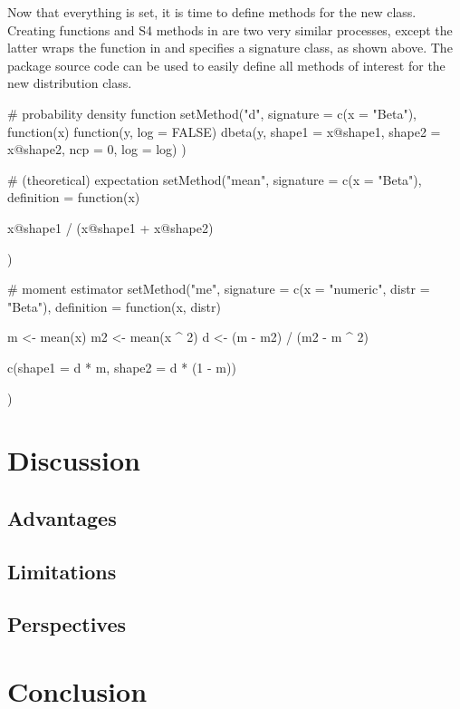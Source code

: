 \documentclass[nojss]{jss}
\newcommand{\fct}[1]{\code{#1()}}
\begin{document}
Now that everything is set, it is time to define methods for the new class. Creating functions and S4 methods in  are two very similar processes, except the latter wraps the function in \fct{setMethod} and specifies a signature class, as shown above. The package source code can be used to easily define all methods of interest for the new distribution class.

\begin{CodeChunk}
\begin{CodeInput}
# probability density function
setMethod("d", signature = c(x = "Beta"),
          function(x) {
            function(y, log = FALSE) {
              dbeta(y, shape1 = x@shape1, shape2 = x@shape2, ncp = 0,
                    log = log)
            }
          })

# (theoretical) expectation
setMethod("mean",
          signature  = c(x = "Beta"),
          definition = function(x) {

  x@shape1 / (x@shape1 + x@shape2)

})

# moment estimator
setMethod("me",
          signature  = c(x = "numeric", distr = "Beta"),
          definition = function(x, distr) {

  m  <- mean(x)
  m2 <- mean(x ^ 2)
  d  <- (m - m2) / (m2 - m ^ 2)

  c(shape1 = d * m, shape2 = d * (1 - m))

})
\end{CodeInput}
\end{CodeChunk}

\section[Discussion]{Discussion}

\subsection[Advantages]{Advantages}

\subsection[Limitations]{Limitations}

\subsection[Perspectives]{Perspectives}

\section[Conclusion]{Conclusion}
\end{document}
